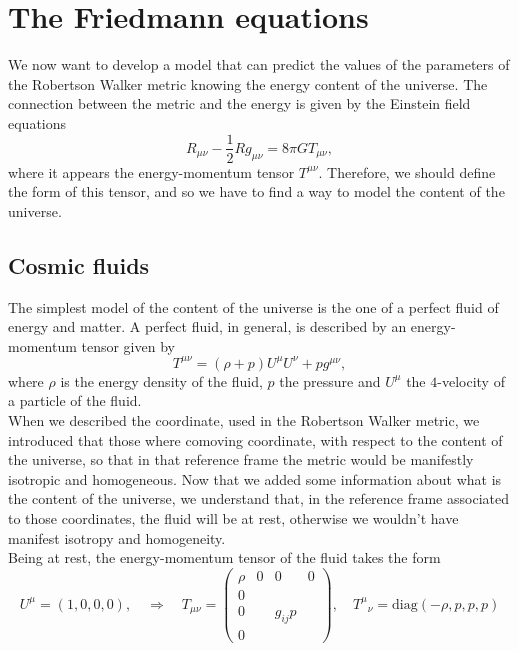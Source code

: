 \section{The Friedmann equations}
We now want to develop a model that can predict the values of the parameters of the Robertson Walker metric knowing the energy content of the universe. The connection between the metric and the energy is given by the Einstein field equations
\begin{equation}\label{EFE}
    R_{\mu\nu}-\frac{1}{2}Rg_{\mu\nu}=8\pi GT_{\mu\nu},
\end{equation}
where it appears the energy-momentum tensor $T^{\mu\nu}$. Therefore, we should define the form of this tensor, and so we have to find a way to model the content of the universe.
\subsection{Cosmic fluids}
The simplest model of the content of the universe is the one of a perfect fluid of energy and matter. A perfect fluid, in general, is described by an energy-momentum tensor given by
\begin{equation}
    T^{\mu\nu}=(\rho+p)U^\mu U^\nu+pg^{\mu\nu},
\end{equation}
where $\rho$ is the energy density of the fluid, $p$ the pressure and $U^\mu$ the $4$-velocity of a particle of the fluid.\\When we described the coordinate, used in the Robertson Walker metric, we introduced that those where comoving coordinate, with respect to the content of the universe, so that in that reference frame the metric would be manifestly isotropic and homogeneous. Now that we added some information about what is the content of the universe, we understand that, in the reference frame associated to those coordinates, the fluid will be at rest, otherwise we wouldn't have manifest isotropy and homogeneity.\\Being at rest, the energy-momentum tensor of the fluid takes the form
\begin{equation}
    U^\mu=(1,0,0,0),\quad\Rightarrow\quad
    T_{\mu\nu}=\begin{pmatrix}
        \rho&0&0&0\\
        0&&&\\
        0&&g_{ij}p&\\
        0&&&
    \end{pmatrix},
    \quad T^\mu\phantom{} _\nu=\text{diag}(-\rho,p,p,p)\label{EMTensorCosmicFluid}
\end{equation}
